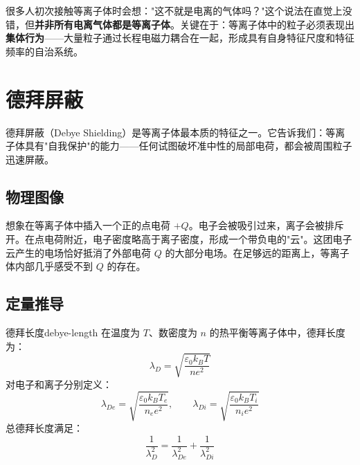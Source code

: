 \documentclass[12pt,a4paper,openany,oneside]{book}
\newcommand{\eps}{\varepsilon}
\newcommand{\vect}[1]{\bm{#1}}
\newcommand{\difficulty}[1]{\marginnote{\textcolor{red}{\textbf{[#1]}}}}
\begin{document}
很多人初次接触等离子体时会想："这不就是电离的气体吗？"这个说法在直觉上没错，但\textbf{并非所有电离气体都是等离子体}。关键在于：等离子体中的粒子必须表现出\textbf{集体行为}——大量粒子通过长程电磁力耦合在一起，形成具有自身特征尺度和特征频率的自治系统。

\section{德拜屏蔽}\difficulty{基础}

德拜屏蔽（Debye Shielding）是等离子体最本质的特征之一。它告诉我们：等离子体具有"自我保护"的能力——任何试图破坏准中性的局部电荷，都会被周围粒子迅速屏蔽。

\subsection{物理图像}

想象在等离子体中插入一个正的点电荷 $+Q$。电子会被吸引过来，离子会被排斥开。在点电荷附近，电子密度略高于离子密度，形成一个带负电的"云"。这团电子云产生的电场恰好抵消了外部电荷 $Q$ 的大部分电场。在足够远的距离上，等离子体内部几乎感受不到 $Q$ 的存在。

\begin{center}
\end{center}

\subsection{定量推导}

\begin{theorem}{德拜长度}{debye-length}
在温度为 $T$、数密度为 $n$ 的热平衡等离子体中，德拜长度为：
\[
\lambda_D = \sqrt{\frac{\eps_0 k_B T}{n e^2}}
\]
对电子和离子分别定义：
\[
\lambda_{De} = \sqrt{\frac{\eps_0 k_B T_e}{n_e e^2}}, \qquad \lambda_{Di} = \sqrt{\frac{\eps_0 k_B T_i}{n_i e^2}}
\]
总德拜长度满足：
\[
\frac{1}{\lambda_D^2} = \frac{1}{\lambda_{De}^2} + \frac{1}{\lambda_{Di}^2}
\]
\end{theorem}
\end{document}
